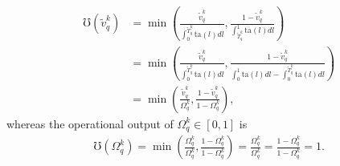 \documentclass[hidelinks, nonatbib]{elsarticle}
\begin{document}
\begin{enumerate}
    \begin{align}
        \mho(\tilde{v}_{q}^{k})
        &=
        \min\left(
            \frac{
                \tilde{v}_{q}^{k}
            }{
                \int_{0}^{
                    \tilde{T}_{q}^{k}
                }{
                    \text{ta}(l)
                    dl
                }
            }
            ,
            \frac{
                1 - \tilde{v}_{q}^{k}
            }{
                \int_{
                    \tilde{T}_{q}^{k}
                }^{1}{
                    \text{ta}(l)
                    dl
                }
            }
        \right)
        \\
        &=
        \min\left(
            \frac{
                \tilde{v}_{q}^{k}
            }{
                \int_{0}^{
                    \tilde{T}_{q}^{k}
                }{
                    \text{ta}(l)
                    dl
                }
            }
            ,
            \frac{
                1 - \tilde{v}_{q}^{k}
            }{
                \int_{0}^{1}{
                    \text{ta}(l)
                    dl
                }
                -
                \int_{0}^{
                    \tilde{T}_{q}^{k}
                }{
                    \text{ta}(l)
                    dl
                }
            }
        \right)
        \\
        &=
        \min\left(
            \frac{
                \tilde{v}_{q}^{k}
            }{
                \Omega_{q}^{k}
            }
            ,
            \frac{
                1 - \tilde{v}_{q}^{k}
            }{
                1 - \Omega_{q}^{k}
            }
        \right)
        ,
    \end{align}
    whereas the operational output of $\Omega_{q}^{k} \in [0,1]$ is
    \begin{align}
        \mho(\Omega_{q}^{k}) 
        =
        \min\left(
            \frac{
                \Omega_{q}^{k}
            }{
                \Omega_{q}^{k}
            }
            ,
            \frac{
                1 - \Omega_{q}^{k}
            }{
                1 - \Omega_{q}^{k}
            }
        \right)
        =
        \frac{
            \Omega_{q}^{k}
        }{
            \Omega_{q}^{k}
        }
        =
        \frac{
            1 - \Omega_{q}^{k}
        }{
            1 - \Omega_{q}^{k}
        }
        =
        1
        .
    \end{align}


\end{enumerate}
\end{document}
